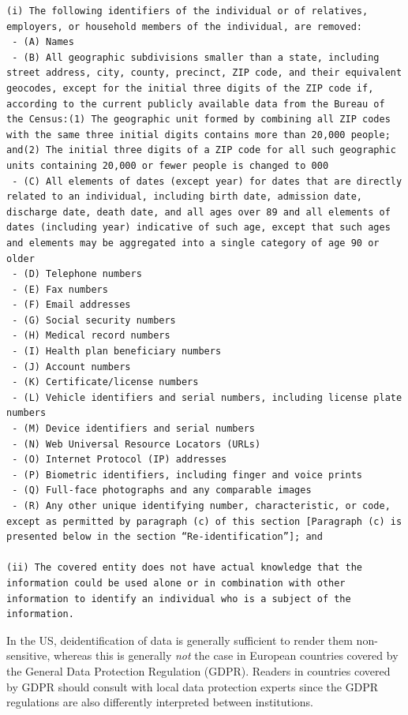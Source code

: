 \begin{lstlisting}[style=transcript]
(i) The following identifiers of the individual or of relatives, employers, or household members of the individual, are removed:
 - (A) Names
 - (B) All geographic subdivisions smaller than a state, including street address, city, county, precinct, ZIP code, and their equivalent geocodes, except for the initial three digits of the ZIP code if, according to the current publicly available data from the Bureau of the Census:(1) The geographic unit formed by combining all ZIP codes with the same three initial digits contains more than 20,000 people; and(2) The initial three digits of a ZIP code for all such geographic units containing 20,000 or fewer people is changed to 000
 - (C) All elements of dates (except year) for dates that are directly related to an individual, including birth date, admission date, discharge date, death date, and all ages over 89 and all elements of dates (including year) indicative of such age, except that such ages and elements may be aggregated into a single category of age 90 or older
 - (D) Telephone numbers
 - (E) Fax numbers
 - (F) Email addresses
 - (G) Social security numbers
 - (H) Medical record numbers
 - (I) Health plan beneficiary numbers
 - (J) Account numbers
 - (K) Certificate/license numbers
 - (L) Vehicle identifiers and serial numbers, including license plate numbers
 - (M) Device identifiers and serial numbers
 - (N) Web Universal Resource Locators (URLs)
 - (O) Internet Protocol (IP) addresses
 - (P) Biometric identifiers, including finger and voice prints
 - (Q) Full-face photographs and any comparable images
 - (R) Any other unique identifying number, characteristic, or code, except as permitted by paragraph (c) of this section [Paragraph (c) is presented below in the section “Re-identification”]; and

(ii) The covered entity does not have actual knowledge that the information could be used alone or in combination with other information to identify an individual who is a subject of the information.
\end{lstlisting}

In the US, deidentification of data is generally sufficient to render them non-sensitive, whereas this is generally \textit{not} the case in European countries covered by the General Data Protection Regulation (GDPR).  Readers in countries covered by GDPR should consult with local data protection experts since the GDPR regulations are also differently interpreted between institutions.

